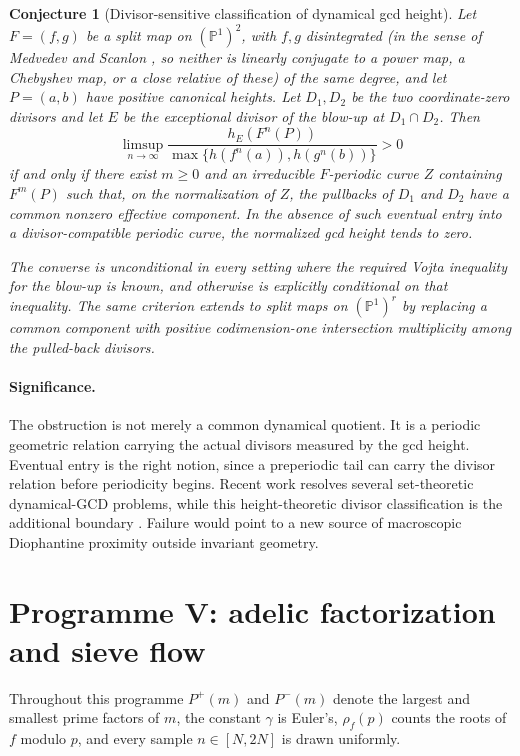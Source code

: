 \documentclass[11pt]{article}
\newtheorem{conjecture}{Conjecture}
\begin{document}
\begin{conjecture}[Divisor-sensitive classification of dynamical gcd height]\label{c20}
Let $F=(f,g)$ be a split map on $(\mathbb P^1)^2$, with $f,g$ disintegrated (in the sense of Medvedev and Scanlon
\cite{MedvedevScanlon}, so neither is
linearly conjugate to a power map, a Chebyshev map, or a close relative of these) of
the same degree, and let $P=(a,b)$ have positive canonical heights.  Let $D_1,D_2$ be the two
coordinate-zero divisors and let $E$ be the exceptional divisor of the blow-up at
$D_1\cap D_2$.  Then
\[
 \limsup_{n\to\infty}
 \frac{h_E(F^n(P))}{\max\{h(f^n(a)),h(g^n(b))\}}>0
\]
if and only if there exist $m\ge0$ and an irreducible $F$-periodic curve $Z$ containing
$F^m(P)$ such that, on the normalization of $Z$, the pullbacks of $D_1$ and $D_2$ have a
common nonzero effective component.  In the absence of such eventual entry into a
divisor-compatible periodic curve, the normalized gcd height tends to zero.

The converse is unconditional in every setting where the required Vojta inequality for
the blow-up is known, and otherwise is explicitly conditional on that inequality.  The
same criterion extends to split maps on $(\mathbb P^1)^r$ by replacing a common component
with positive codimension-one intersection multiplicity among the pulled-back divisors.
\end{conjecture}

\paragraph{Significance.}
The obstruction is not merely a common dynamical quotient.  It is a periodic geometric
relation carrying the actual divisors measured by the gcd height.  Eventual entry is the right
notion, since a preperiodic tail can carry the divisor relation before periodicity
begins.  Recent work resolves several set-theoretic
dynamical-GCD problems, while this height-theoretic divisor classification is the
additional boundary \cite{YangZhong}.  Failure would point to a new source of
macroscopic Diophantine proximity outside invariant geometry.

\section{Programme V: adelic factorization and sieve flow}

Throughout this programme $P^+(m)$ and $P^-(m)$ denote the largest and smallest prime
factors of $m$, the constant $\gamma$ is Euler's, $\rho_f(p)$ counts the roots
of $f$ modulo $p$, and every sample $n\in[N,2N]$ is drawn uniformly.
\end{document}
